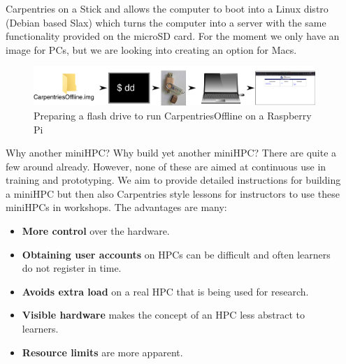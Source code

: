 \documentclass[final,20pt]{beamer}
\newlength{\sepwidth}
\newlength{\colwidth}
\newcommand{\separatorcolumn}{\begin{column}{\sepwidth}\end{column}}
\begin{document}
\begin{frame}[t]
\begin{columns}[t]
\begin{column}{\colwidth}
\begin{alertblock}{Carpentries on a Stick}
					and allows the computer to boot into a Linux distro (Debian based Slax) which turns the computer into a server with the same functionality 
					provided on the microSD card. For the moment we only have an image for PCs, but we are looking into creating an option for Macs.
					\vspace{8mm}		
					\begin{center}
						\begin{figure}
							\includegraphics[width=0.9\columnwidth]{svg/flashdrive.png}
							\caption{Preparing a flash drive to run CarpentriesOffline on a Raspberry Pi}
						\end{figure}
					\end{center}
				
				\end{alertblock}
				\begin{alertblock}{Why another miniHPC?}
					Why build yet another miniHPC? There are quite a few around already. However, none of these 
					are aimed at continuous use in training and prototyping. We aim to provide detailed instructions
					for building a miniHPC but then also Carpentries style lessons for instructors to use these 
					miniHPCs in workshops. The advantages are many:
						\break
						\begin{itemize}
						\item \textbf{More control} over the hardware.
						\item \textbf{Obtaining user accounts} on HPCs can be difficult and often
						learners do not register in time.
						\item \textbf{Avoids extra load} on a real HPC that is being used for research.
						\item \textbf{Visible hardware} makes the concept of an HPC less abstract to learners.
						\item \textbf{Resource limits} are more apparent. 
						\break

						\break

					\end{itemize}
				\end{alertblock}		
			\end{column}
			\separatorcolumn
		\end{columns}
	

\end{frame}
\end{document}
